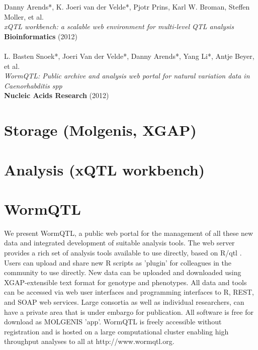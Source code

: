 \documentclass[8pt, twoside, a5paper]{report}
\newenvironment{myexampleblock}[1]{%
    \tcolorbox[beamer,%
    noparskip,breakable,
    colback=LightGreen,colframe=DarkGreen,%
    colbacklower=LimeGreen!75!LightGreen,%
    title=#1]}%
    {\endtcolorbox}
\newcommand{\authors}[1]{\small{#1}}
\newcommand{\bold}[1]{{\bfseries #1}}
\begin{document}
\null
\vfill

\begin{myexampleblock}{Originally published as:}
  \authors{Danny Arends*, K. Joeri van der Velde*, Pjotr Prins, Karl W. Broman, Steffen Moller, et al.}\\
  \emph{xQTL workbench: a scalable web environment for multi-level QTL analysis}\\
  \bold{Bioinformatics} (2012)\\\\

  \authors{L. Basten Snoek*, Joeri Van der Velde*, Danny Arends*, Yang Li*, Antje Beyer, et al.}\\
  \emph{WormQTL: Public archive and analysis web portal for natural variation data in Caenorhabditis spp}\\
  \bold{Nucleic Acids Research} (2012)
\end{myexampleblock}

\newpage

\section{Storage (Molgenis, XGAP)}
\lipsum

\section{Analysis (xQTL workbench)}
\lipsum

\section{WormQTL}
We present WormQTL, a public web portal for the management of all these new data and integrated development 
of suitable analysis tools. The web server provides a rich set of analysis tools available to use directly, 
based on R/qtl \cite{Broman:2003, Arends:2010}. Users can upload and share new R scripts as 'plugin' for 
colleagues in the community to use directly. New data can be uploaded and downloaded using XGAP-extensible 
text format for genotype and phenotypes\cite{Swertz:2010a}. All data and tools can be accessed via web user 
interfaces and programming interfaces to R, REST, and SOAP web services. Large consortia as well as individual 
researchers, can have a private area that is under embargo for publication. All software is free for download 
as MOLGENIS 'app'\cite{Swertz:2010b}. WormQTL is freely accessible without registration and is hosted on a 
large computational cluster enabling high throughput analyses to all at http://www.wormqtl.org.
\end{document}
